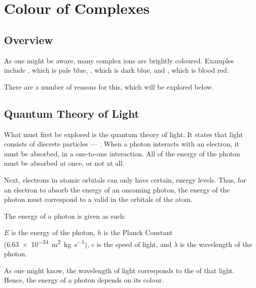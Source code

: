 


	\section{Colour of Complexes}

		\subsection{Overview}

			As one might be aware, many complex ions are brightly coloured. Examples include , which is pale blue,
			, which is dark blue, and , which is blood red.

			There are a number of reasons for this, which will be explored below.



		\subsection{Quantum Theory of Light}

			What must first be explored is the quantum theory of light. It states that light consists of discrete particles --- .
			When a photon interacts with an electron, it must be  absorbed, in a one-to-one interaction. All of the energy of
			the photon must be absorbed at once, or not at all.

			Next, electrons in atomic orbitals can only have certain,  energy levels. Thus, for an electron to absorb the energy
			of an oncoming photon, the energy of the photon must correspond  to a valid  in the orbitals of
			the atom.

			The energy of a photon is given as such:


			$E$ is the energy of the photon, $h$ is the Planck Constant (\SI{6.63e-34}{\square\metre\kilo\gram\per\second}), $c$ is
			the speed of light, and $\lambda$ is the wavelength of the photon.

			As one might know, the wavelength of light corresponds to the  of that light. Hence, the energy of a photon depends
			on its colour.

